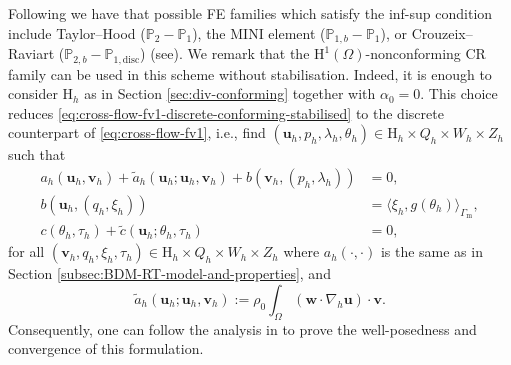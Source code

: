 \documentclass[onefignum,onetabnum,reqno,a4paper,final]{siamart250211}
\newcommand\bu{\boldsymbol{u}}
\newcommand\bv{\boldsymbol{v}}
\newcommand\bw{\boldsymbol{w}}
\newcommand\0{\mathbf{0}}
\newcommand\bH{\boldsymbol{\mathrm{H}}}
\newcommand\Gm{\Gamma_{\mathrm{m}}}
\numberwithin{figure}{section}
\numberwithin{table}{section}
\begin{document}
	Following \cite{urquiza2014weak} we have that possible FE families which satisfy the inf-sup condition include Taylor--Hood ($\mathbb{P}_2-\mathbb{P}_1$), the MINI element ($\mathbb{P}_{1,b}-\mathbb{P}_1$), or Crouzeix--Raviart ($\mathbb{P}_{2,b}-\mathbb{P}_{1,\text{disc}}$) (see\cite{crouzeix1973conforming}).  We remark that the $\bH^1(\Omega)$-nonconforming CR family can be used in this scheme without  stabilisation. Indeed, it is enough to consider $\bH_h$ as in Section \ref{sec:div-conforming} together with $\alpha_0=0$. This choice  reduces \eqref{eq:cross-flow-fv1-discrete-conforming-stabilised} to the discrete counterpart of \eqref{eq:cross-flow-fv1}, i.e., find $(\bu_h,p_h,\lambda_h,\theta_h)\in \bH_h\times Q_h\times W_h\times Z_h$ such that
	\begin{equation}
		\label{eq:CR-cross-flow-fv1-discrete-conforming}
		\begin{aligned}
			a_h(\bu_h,\bv_h)+ \widetilde{a}_h(\bu_h;\bu_h,\bv_h) + b(\bv_h,(p_h,\lambda_h))  &=0 ,\\
			b(\bu_h,(q_h,\xi_h))&= \langle\xi_h, g(\theta_h)\rangle_{\Gm} ,\\
			c(\theta_h,\tau_h) + \widetilde{c}(\bu_h;\theta_h,\tau_h)&=0,
		\end{aligned}
	\end{equation}
	for all $(\bv_h,q_h,\xi_h,\tau_h)\in \bH_h \times Q_h\times W_h\times Z_h$
	where $a_h(\cdot,\cdot)$ is the same as in Section \ref{subsec:BDM-RT-model-and-properties}, and
	$$
	\widetilde{a}_h(\bu_h;\bu_h,\bv_h):= \rho_0\int_\Omega (\bw\cdot\nabla_h\bu)\cdot\bv.
	$$
	Consequently, one can follow the analysis in \cite{kashiwabara2019penalty} to prove the well-posedness and convergence of this formulation.
\end{document}
